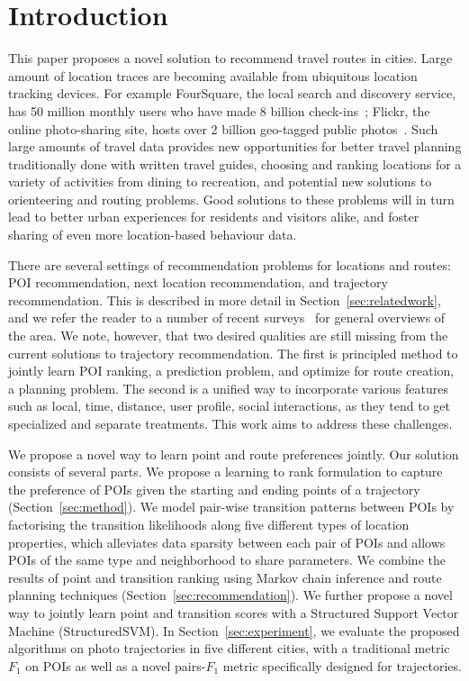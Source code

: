
\section{Introduction}
\label{sec:intro}

This paper proposes a novel solution to recommend travel routes in cities.
Large amount of location traces are becoming available from ubiquitous location tracking devices.
For example FourSquare, the local search and discovery service, has 50 million monthly users who have made 8 billion check-ins~\cite{4sq}; Flickr, the online photo-sharing site, hosts over 2 billion geo-tagged public photos~\cite{flickr}. Such large amounts of travel data provides new opportunities for better
travel planning traditionally done with written travel guides,
choosing and ranking locations for a variety of activities from dining to recreation,
and potential new solutions to orienteering and routing problems.
Good solutions to these problems will in turn lead to better urban experiences for residents and visitors alike, and foster sharing of even more location-based behaviour data.

There are several settings of recommendation problems for locations and routes: POI recommendation,
next location recommendation, and trajectory recommendation. This is described in more detail in
Section~\ref{sec:relatedwork}, and we refer the reader to a number of recent
surveys~\cite{bao2015recommendations,zheng2015trajectory,zheng2014urban}
for general overviews of the area. %
We note, however, that two desired qualities are still 
missing from the current solutions to trajectory recommendation. 
The first is principled method to jointly learn POI ranking, a prediction problem, 
and optimize for route creation, a planning problem. 
The second is a unified way to incorporate various features 
such as local, time, distance, user profile, social interactions, 
as they tend to get specialized and separate treatments. 
This work aims to address these challenges. %

We propose a novel way to learn point and route preferences jointly.
Our solution consists of several parts.
We propose a learning to rank formulation to capture the preference of POIs given the starting and ending points of a trajectory (Section~\ref{sec:method}).
We model pair-wise transition patterns between POIs by factorising the transition likelihoods along five different types of location properties,
which alleviates data sparsity between each pair of POIs and allows POIs of the same type and neighborhood to share parameters.
We combine the results of point and transition ranking using Markov chain inference and route planning techniques (Section~\ref{sec:recommendation}). We further propose a novel way to jointly learn point and transition scores with a Structured Support Vector Machine (StructuredSVM). In Section~\ref{sec:experiment},
we evaluate the proposed algorithms on photo trajectories in five different cities, with a traditional metric $F_1$ on POIs as well as a novel pairs-$F_1$ metric specifically designed for trajectories.

